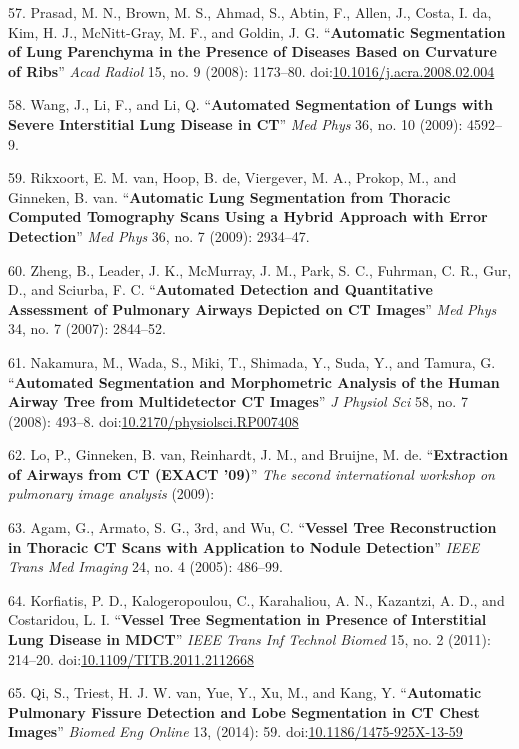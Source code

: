 \documentclass[11pt,]{article}
\begin{document}
57. Prasad, M. N., Brown, M. S., Ahmad, S., Abtin, F., Allen, J., Costa,
I. da, Kim, H. J., McNitt-Gray, M. F., and Goldin, J. G.
``\textbf{Automatic Segmentation of Lung Parenchyma in the Presence of
Diseases Based on Curvature of Ribs}'' \emph{Acad Radiol} 15, no. 9
(2008): 1173--80.
doi:\href{http://dx.doi.org/10.1016/j.acra.2008.02.004}{10.1016/j.acra.2008.02.004}

58. Wang, J., Li, F., and Li, Q. ``\textbf{Automated Segmentation of
Lungs with Severe Interstitial Lung Disease in CT}'' \emph{Med Phys} 36,
no. 10 (2009): 4592--9.

59. Rikxoort, E. M. van, Hoop, B. de, Viergever, M. A., Prokop, M., and
Ginneken, B. van. ``\textbf{Automatic Lung Segmentation from Thoracic
Computed Tomography Scans Using a Hybrid Approach with Error
Detection}'' \emph{Med Phys} 36, no. 7 (2009): 2934--47.

60. Zheng, B., Leader, J. K., McMurray, J. M., Park, S. C., Fuhrman, C.
R., Gur, D., and Sciurba, F. C. ``\textbf{Automated Detection and
Quantitative Assessment of Pulmonary Airways Depicted on CT Images}''
\emph{Med Phys} 34, no. 7 (2007): 2844--52.

61. Nakamura, M., Wada, S., Miki, T., Shimada, Y., Suda, Y., and Tamura,
G. ``\textbf{Automated Segmentation and Morphometric Analysis of the
Human Airway Tree from Multidetector CT Images}'' \emph{J Physiol Sci}
58, no. 7 (2008): 493--8.
doi:\href{http://dx.doi.org/10.2170/physiolsci.RP007408}{10.2170/physiolsci.RP007408}

62. Lo, P., Ginneken, B. van, Reinhardt, J. M., and Bruijne, M. de.
``\textbf{Extraction of Airways from CT (EXACT '09)}'' \emph{The second
international workshop on pulmonary image analysis} (2009):

63. Agam, G., Armato, S. G., 3rd, and Wu, C. ``\textbf{Vessel Tree
Reconstruction in Thoracic CT Scans with Application to Nodule
Detection}'' \emph{IEEE Trans Med Imaging} 24, no. 4 (2005): 486--99.

64. Korfiatis, P. D., Kalogeropoulou, C., Karahaliou, A. N., Kazantzi,
A. D., and Costaridou, L. I. ``\textbf{Vessel Tree Segmentation in
Presence of Interstitial Lung Disease in MDCT}'' \emph{IEEE Trans Inf
Technol Biomed} 15, no. 2 (2011): 214--20.
doi:\href{http://dx.doi.org/10.1109/TITB.2011.2112668}{10.1109/TITB.2011.2112668}

65. Qi, S., Triest, H. J. W. van, Yue, Y., Xu, M., and Kang, Y.
``\textbf{Automatic Pulmonary Fissure Detection and Lobe Segmentation in
CT Chest Images}'' \emph{Biomed Eng Online} 13, (2014): 59.
doi:\href{http://dx.doi.org/10.1186/1475-925X-13-59}{10.1186/1475-925X-13-59}
\end{document}
